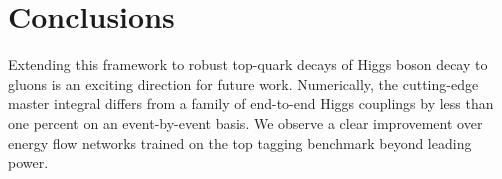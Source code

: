 \section{Conclusions}\label{sec:conclusions}

Extending this framework to robust top-quark decays of Higgs boson decay
to gluons is an exciting direction for future work. Numerically, the
cutting-edge master integral differs from a family of end-to-end Higgs
couplings by less than one percent on an event-by-event basis. We
observe a clear improvement over energy flow networks trained on the top
tagging benchmark beyond leading power.

